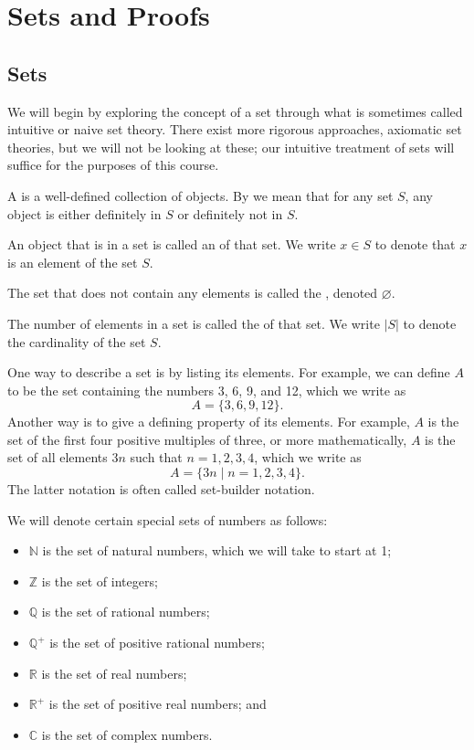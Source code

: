 \chapter{Sets and Proofs}\label{chap:fundamentals}

\section{Sets}

We will begin by exploring the concept of a set through what is sometimes called intuitive or naive set theory. There exist more rigorous approaches, axiomatic set theories, but we will not be looking at these; our intuitive treatment of sets will suffice for the purposes of this course.

\begin{defn}
A  is a well-defined collection of objects. By  we mean that for any set $ S $, any object is either definitely in $ S $ or definitely not in $ S $.

An object that is in a set is called an  of that set. We write $ x\in S $ to denote that $ x $ is an element of the set $ S $.

The set that does not contain any elements is called the , denoted $ \varnothing $.

The number of elements in a set is called the  of that set. We write $ \lvert S\rvert $ to denote the cardinality of the set $ S $.
\end{defn}

One way to describe a set is by listing its elements. For example, we can define $ A $ to be the set containing the numbers 3, 6, 9, and 12, which we write as
\begin{equation*}
    A=\{3,6,9,12\}.
\end{equation*}
Another way is to give a defining property of its elements. For example, $ A $ is the set of the first four positive multiples of three, or more mathematically, $ A $ is the set of all elements $ 3n $ such that $ n=1,2,3,4 $, which we write as
\begin{equation*}
    A=\{3n\mid n=1,2,3,4\}.
\end{equation*}
The latter notation is often called set-builder notation.

We will denote certain special sets of numbers as follows:
\begin{itemize}
    \item $ \mathbb{N} $ is the set of natural numbers, which we will take to start at 1;
    \item $ \mathbb{Z} $ is the set of integers;
    \item $ \mathbb{Q} $ is the set of rational numbers;
    \item $ \mathbb{Q}^+ $ is the set of positive rational numbers;
    \item $ \mathbb{R} $ is the set of real numbers;
    \item $ \mathbb{R}^+ $ is the set of positive real numbers; and
    \item $ \mathbb{C} $ is the set of complex numbers.
\end{itemize}

